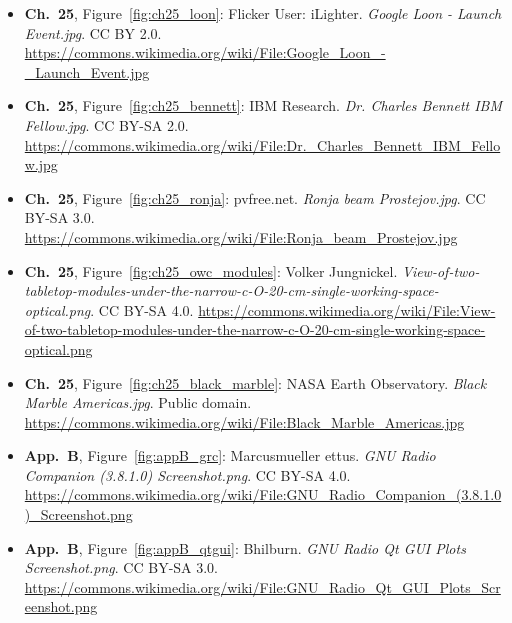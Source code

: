 \begin{small}
\begin{itemize}[leftmargin=0pt,itemsep=2pt,label={}]
\item \textbf{Ch.~25}, Figure~\ref{fig:ch25_loon}: Flicker User: iLighter. \emph{Google Loon -\allowbreak{} Launch Event.\allowbreak{}jpg}. CC BY 2.0. \url{https://commons.wikimedia.org/wiki/File:Google_Loon_-_Launch_Event.jpg}
\item \textbf{Ch.~25}, Figure~\ref{fig:ch25_bennett}: IBM Research. \emph{Dr.\allowbreak{} Charles Bennett IBM Fellow.\allowbreak{}jpg}. CC BY-SA 2.0. \url{https://commons.wikimedia.org/wiki/File:Dr._Charles_Bennett_IBM_Fellow.jpg}
\item \textbf{Ch.~25}, Figure~\ref{fig:ch25_ronja}: pvfree.net. \emph{Ronja beam Prostejov.\allowbreak{}jpg}. CC BY-SA 3.0. \url{https://commons.wikimedia.org/wiki/File:Ronja_beam_Prostejov.jpg}
\item \textbf{Ch.~25}, Figure~\ref{fig:ch25_owc_modules}: Volker Jungnickel. \emph{View-\allowbreak{}of-\allowbreak{}two-\allowbreak{}tabletop-\allowbreak{}modules-\allowbreak{}under-\allowbreak{}the-\allowbreak{}narrow-\allowbreak{}c-\allowbreak{}O-\allowbreak{}20-\allowbreak{}cm-\allowbreak{}single-\allowbreak{}working-\allowbreak{}space-\allowbreak{}optical.\allowbreak{}png}. CC BY-SA 4.0. \url{https://commons.wikimedia.org/wiki/File:View-of-two-tabletop-modules-under-the-narrow-c-O-20-cm-single-working-space-optical.png}
\item \textbf{Ch.~25}, Figure~\ref{fig:ch25_black_marble}: NASA Earth Observatory. \emph{Black Marble Americas.\allowbreak{}jpg}. Public domain. \url{https://commons.wikimedia.org/wiki/File:Black_Marble_Americas.jpg}
\item \textbf{App.~B}, Figure~\ref{fig:appB_grc}: Marcusmueller ettus. \emph{GNU Radio Companion (3.\allowbreak{}8.\allowbreak{}1.\allowbreak{}0) Screenshot.\allowbreak{}png}. CC BY-SA 4.0. \url{https://commons.wikimedia.org/wiki/File:GNU_Radio_Companion_(3.8.1.0)_Screenshot.png}
\item \textbf{App.~B}, Figure~\ref{fig:appB_qtgui}: Bhilburn. \emph{GNU Radio Qt GUI Plots Screenshot.\allowbreak{}png}. CC BY-SA 3.0. \url{https://commons.wikimedia.org/wiki/File:GNU_Radio_Qt_GUI_Plots_Screenshot.png}
\end{itemize}\end{small}
\endgroup
